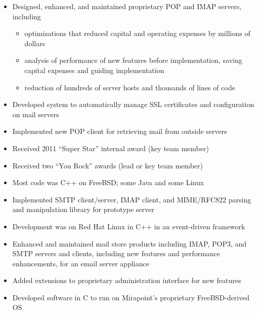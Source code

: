 \documentclass[letterpaper,11pt,twoside]{article}
\begin{document}
\vspace{-18pt}
\begin{itemize}
\item Designed, enhanced, and maintained proprietary POP and IMAP
  servers, including
  \begin{itemize}
  \item optimizations that reduced capital and operating expenses
    by millions of dollars
  \item analysis of performance of new features before
    implementation, saving capital expenses and guiding implementation
  \item reduction of hundreds of server hosts and thousands of lines of code
  \end{itemize}
\item Developed system to automatically manage SSL certificates and
  configuration on mail servers
\item Implemented new POP client for retrieving mail from outside servers
\item Received 2011 ``Super Star'' internal award (key team member)
\item Received two ``You Rock'' awards (lead or key team member)
\item Most code was C++ on FreeBSD; some Java and some Linux
\end{itemize}

\vspace{-18pt}
\begin{itemize}
\item Implemented SMTP client/server, IMAP client, and
  MIME/RFC822 parsing and manipulation library for prototype server
\item Development was on Red Hat Linux in C++ in an event-driven framework
\end{itemize}


\vspace{-18pt}
\begin{itemize}
\item Enhanced and maintained mail store products including
  IMAP, POP3, and SMTP servers and clients, including new features
  and performance enhancements, for an email server appliance
\item Added extensions to proprietary administration interface for new
  features
\item Developed software in C to run on Mirapoint’s proprietary
  FreeBSD-derived OS
\end{itemize}
\end{document}
